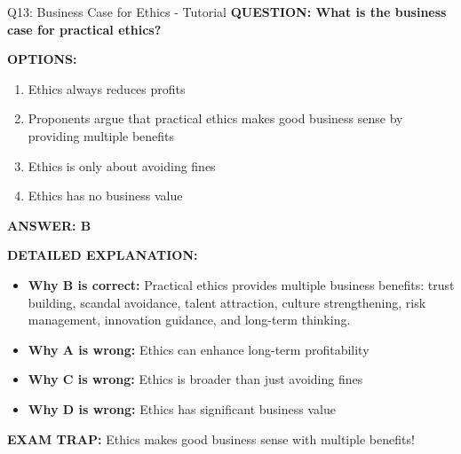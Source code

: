 \documentclass[8pt]{beamer}
\begin{document}
	\begin{frame}{Q13: Business Case for Ethics - Tutorial}
		\fontsize{6.5}{7.5}\selectfont
		\textbf{QUESTION: What is the business case for practical ethics?}
		
		\vspace{0.1cm}
		\textbf{OPTIONS:}
		\begin{enumerate}
			\item Ethics always reduces profits
			\item Proponents argue that practical ethics makes good business sense by providing multiple benefits
			\item Ethics is only about avoiding fines
			\item Ethics has no business value
		\end{enumerate}
		
		\vspace{0.1cm}
		\textcolor{myblue}{\textbf{ANSWER: B}}
		
		\vspace{0.1cm}
		\textbf{DETAILED EXPLANATION:}
		\begin{itemize}
			\item \textbf{Why B is correct:} Practical ethics provides multiple business benefits: trust building, scandal avoidance, talent attraction, culture strengthening, risk management, innovation guidance, and long-term thinking.
			\item \textbf{Why A is wrong:} Ethics can enhance long-term profitability
			\item \textbf{Why C is wrong:} Ethics is broader than just avoiding fines
			\item \textbf{Why D is wrong:} Ethics has significant business value
		\end{itemize}
		
		\textcolor{myred}{\textbf{EXAM TRAP:}} Ethics makes \textcolor{myblue}{good business sense} with multiple benefits!
	\end{frame}
	
\end{document}
